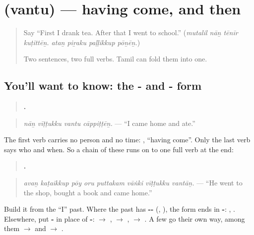 \section[\texorpdfstring{\ta{வந்து} (vantu)}{வந்து (vantu)}]{ (vantu) — having come, and then}

\label{lesson:TA-C285-vantu}



\begin{quote}
Say \textquotedblleft{}First I drank tea. After that I went to school.\textquotedblright{} (\emph{mutalil nāṉ tēnīr kuṭittēṉ. ataṉ piṟaku paḷḷikkup pōṉēṉ.})

Two sentences, two full verbs. Tamil can fold them into one.
\end{quote}

\subsection*{You'll want to know: the - and - form}
\begin{quote}
\textbf{   .}
\end{quote}

\begin{quote}
\emph{nāṉ vīṭṭukku vantu cāppiṭṭēṉ.} — \textquotedblleft{}I came home and ate.\textquotedblright{}
\end{quote}

The first verb carries no person and no time: \textbf{}, \textquotedblleft{}having come\textquotedblright{}. Only the last verb says who and when. So a chain of these runs on to one full verb at the end:

\begin{quote}
\textbf{       .}
\end{quote}

\begin{quote}
\emph{avaṉ kaṭaikkup pōy oru puttakam vāṅki vīṭṭukku vantāṉ.} — \textquotedblleft{}He went to the shop, bought a book and came home.\textquotedblright{}
\end{quote}

Build it from the \textquotedblleft{}I\textquotedblright{} past. Where the past has \textbf{--} (\textbf{}, \textbf{}), the form ends in \textbf{-}: \textbf{}, \textbf{}. Elsewhere, put \textbf{-} in place of \textbf{-}: \textbf{} $\to$ \textbf{}, \textbf{} $\to$ \textbf{}, \textbf{} $\to$ \textbf{}. A few go their own way, among them \textbf{} $\to$ \textbf{} and \textbf{} $\to$ \textbf{}.

